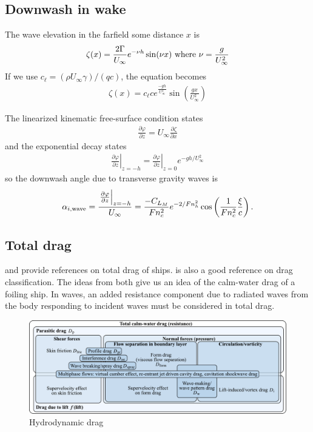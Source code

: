 \documentclass[10pt]{article}
\newcommand{\pp}[2]{\frac{\partial #1}{\partial #2}}
\newcommand{\be}{\begin{eqnarray}}
\newcommand{\ee}{\end{eqnarray}}
\newcommand{\Uinf}{U_{\infty}}
\newcommand{\tn}[1]{\textnormal{#1}}
\begin{document}
\subsection{Downwash in wake}
The wave elevation in the farfield some distance $x$ is
\be
\zeta(x) = \frac{2\Gamma}{\Uinf}e^{-\nu h} \sin(\nu x)
\tn{ where }
\nu = \frac{g}{\Uinf^2}
\ee
If we use $c_\ell = (\rho \Uinf \gamma) /\left(q c\right)$, the equation becomes
\be
\zeta(x) = c_\ell c e^{\frac{-gh}{\Uinf^2}} \sin\left(\frac{g x}{\Uinf^2}\right)
\ee

The linearized kinematic free-surface condition states
\be
\label{eqn:KFSBC}
\pp{\varphi}{z} =
\Uinf \pp{\zeta}{x}
\ee
and the exponential decay states
\be
\left. \pp{\varphi}{z} \right|_{z=-h} =
\left. \pp{\varphi}{z} \right|_{z=0} e^{-gh/\Uinf^2}
\ee
so the downwash angle due to transverse gravity waves is
\be
\alpha_{i,\tn{wave}} = \frac{ \left. \pp{\varphi}{z} \right|_{z=-h} }{\Uinf}
=
\frac{
-C_{L_M}
}{Fn_c^2} e^{{-2}/{Fn_h^2}}
\cos\left(
\frac{1}{Fn_c^2}\frac{\xi}{c}
\right).
\ee

\subsection{Total drag}

\citet[Fig. 21.3]{carlton2007} and \citet[Fig. 4]{Chernyshev2023} provide references on total drag of ships.
\citet[Fig. 12.2]{Raymer2012} is also a good reference on drag classification.
The ideas from both give us an idea of the calm-water drag of a foiling ship.
In waves, an added resistance component due to radiated waves from the body responding to incident waves must be considered in total drag.
\begin{figure}[htb!]
    \centering
    \includegraphics[width=\linewidth,clip,trim={0cm 0cm 0cm 0cm}]{modernDragBuildUp_v2.pdf}
    \caption{\label{fig:HydroDrag}Hydrodynamic drag}
\end{figure}
\clearpage
\end{document}
